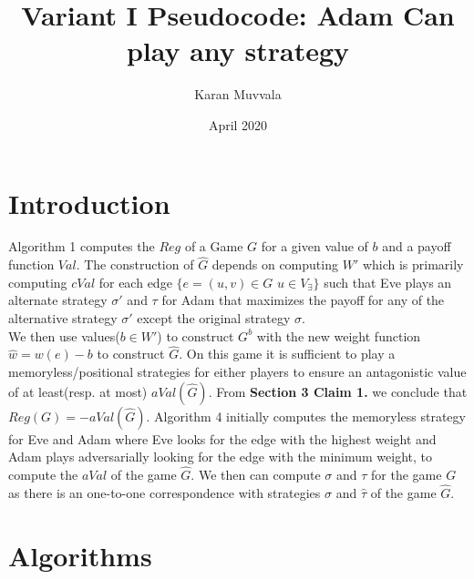 \documentclass{article}
\title{Variant I Pseudocode: Adam Can play any strategy }
\author{Karan Muvvala}
\date{April 2020}
\begin{document}
\maketitle

\section{Introduction}

Algorithm 1 computes the $Reg$ of a Game $G$ for a given value of $b$ and a payoff function $Val$. The construction of $\hat{G}$ depends on computing $W'$ which is primarily computing $cVal$ for each edge $\{e = (u,v) \in G$ \vert $u \in V_\exists \}$ such that Eve plays an alternate strategy $\sigma'$ and $\tau$ for Adam that maximizes the payoff for any of the alternative strategy $\sigma'$ except the original strategy $\sigma$. \\

We then use values($b \in W'$) to construct $G^b$ with the new weight function $\hat{w} = w(e) - b$ to construct $\hat{G}$. On this game it is sufficient to play a memoryless/positional strategies for either players to ensure an antagonistic value of at least(resp. at most) $aVal(\hat{G})$. From \textbf{Section 3 Claim 1.} we conclude that $Reg(G) = -aVal(\hat{G})$. Algorithm 4 initially computes the memoryless strategy for Eve and Adam where Eve looks for the edge with the highest weight and Adam plays adversarially looking for the edge with the minimum weight, to compute the $aVal$ of the game $\hat{G}$. We then can compute $\sigma$ and $\tau$ for the game $G$ as there is an one-to-one correspondence with strategies $\hat{\sigma}$ and $\hat{\tau}$ of the game $\hat{G}$.

\section{Algorithms}
\end{document}
